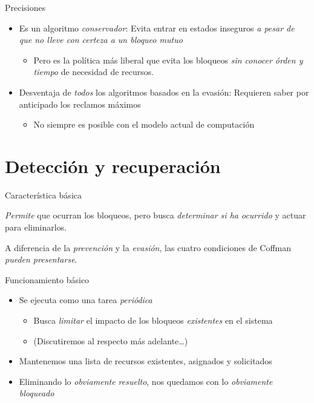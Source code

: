 \documentclass[presentation]{beamer}
\begin{document}
\begin{frame}[label={sec:org587b71b}]{Precisiones}
\begin{itemize}
\item Es un algoritmo \emph{conservador}: Evita entrar en estados inseguros
\emph{a pesar de que no lleve con certeza a un bloqueo mutuo}
\begin{itemize}
\item Pero es la política más liberal que evita los bloqueos \emph{sin
conocer órden y tiempo} de necesidad de recursos.
\end{itemize}
\item Desventaja de \emph{todos} los algoritmos basados en la evasión:
Requieren saber por anticipado los reclamos máximos
\begin{itemize}
\item No siempre es posible con el modelo actual de computación
\end{itemize}
\end{itemize}
\end{frame}

\section{Detección y recuperación}
\label{sec:org9fedec5}

\begin{frame}[label={sec:orgda267f2}]{Característica básica}
\begin{center}
\emph{Permite} que ocurran los bloqueos, pero busca \emph{determinar si ha
ocurrido} y actuar para eliminarlos.

A diferencia de la \emph{prevención} y la \emph{evasión}, las cuatro
condiciones de Coffman \emph{pueden presentarse}.
\end{center}
\end{frame}

\begin{frame}[label={sec:orgde154ff}]{Funcionamiento básico}
\begin{itemize}
\item Se ejecuta como una tarea \emph{periódica}
\begin{itemize}
\item Busca \emph{limitar} el impacto de los bloqueos \emph{existentes} en el
sistema
\item (Discutiremos al respecto más adelante\ldots{})
\end{itemize}
\item Mantenemos una lista de recursos existentes, asignados y
solicitados
\item Eliminando lo \emph{obviamente resuelto}, nos quedamos con lo
\emph{obviamente bloqueado}
\end{itemize}
\end{frame}
\end{document}

